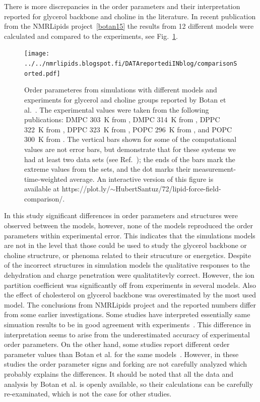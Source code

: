 \documentclass[aps,prl,superscriptaddress,twocolumn]{revtex4}
\begin{document}
There is more discrepancies in the order parameters and their interpretation reported for glycerol backbone and
choline in the literature. In recent publication from the NMRLipids project~\ref{botan15} the results 
from 12 different models were calculated and compared to the experiments, see Fig.~\ref{HGorderparameters}. 
\begin{figure}[]
  \texttt{[image: ../../nmrlipids.blogspot.fi/DATAreportediINblog/comparisonSorted.pdf]}
\newline
  \caption{\label{HGorderparameters}
    Order parameteres from simulations with different models and experiments for glycerol and choline groups reported by Botan et al.~\cite{botan15}.
    The experimental values were taken from the following publications:
    DMPC 303~K from \cite{gross97},
    DMPC 314~K from \cite{dvinskikh05a},
    DPPC 322~K from \cite{gally75},
    DPPC 323~K from \cite{akutsu81},
    POPC 296~K from \cite{bechinger91}, and
    POPC 300~K from \cite{ferreira13}.
    The vertical bars shown for some of the computational values are not error bars, but demonstrate that for 
    these systems we had at least two data sets (see Ref.~\cite{botan15});
    the ends of the bars mark the extreme values from the sets, and the dot marks their measurement-time-weighted average. 
    An interactive version of this figure is available at  https://plot.ly/$\sim$HubertSantuz/72/lipid-force-field-comparison/.
} 
\end{figure}
In this study significant differences in order parameters and structures were observed between the models,
however, none of the models reproduced the order parameters within experimental error.
This indicates that the simulations models are not in the level that those could be used to
study the glycerol backbone or choline structrure, or phenoma related to their strucuture or
energetics. Despite of the incorrect structures in simulation models the qualitative
responses to the dehydration and charge penetration were qualitatitevly correct. 
However, the ion partition coefficient was significantly off from experiments in
several models. Also the effect of cholesterol on glycerol backbone was overestimated
by the most used model. The conclusions from NMRLipids project and the reported 
numbers differ from some earlier investigations. Some studies have interpreted
essentially same simuation results to be in good agreement with experiments~\cite{??}.
This difference in interpretation seems to arise from the underestimated accuracy
of experimental order parameters. On the other hand, some studies report different
order parameter values than Botan et al. for the same models~\cite{??}.
However, in these studies the order parameter signs and forking are not carefully analyzed
which probably explains the differences. It should be noted that all the data
and analysis by Botan et al. is openly available, so their calculations can 
be carefully re-examinated, which is not the case for other studies.
\end{document}
